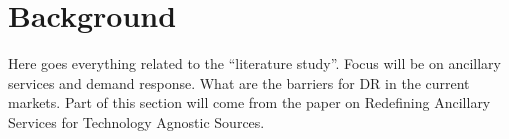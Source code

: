 \chapter{Background} %
\label{cha:background}
Here goes everything related to the ``literature study''. Focus will be on ancillary services and demand response. What are the barriers for DR in the current markets. Part of this section will come from the paper on Redefining Ancillary Services for Technology Agnostic Sources.


